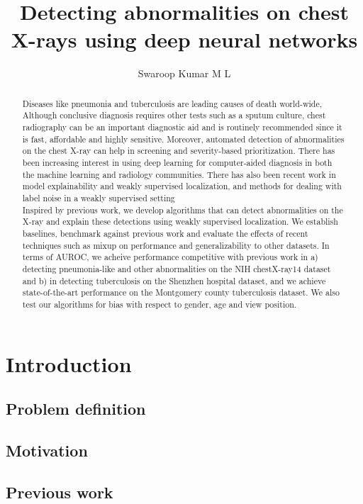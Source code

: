 \documentclass[11pt,twoside,a4paper]{report}
\title{Detecting abnormalities on chest X-rays using deep neural networks}
\author{Swaroop Kumar M L}
\begin{document}
\maketitle
\begin{abstract}
    Diseases like pneumonia and tuberculosis are leading causes of death world-wide,
    Although conclusive diagnosis requires other tests such as a sputum culture,
    chest radiography can be an important diagnostic aid and is routinely recommended
    since it is fast, affordable and highly sensitive. Moreover, automated detection of
    abnormalities on the chest X-ray can help in screening and severity-based prioritization.
    There has been increasing interest in using deep learning for computer-aided diagnosis in both the
    machine learning and radiology communities. There has also been recent work in model explainability and
    weakly supervised localization, and methods for dealing with label noise in a weakly supervised setting\\

    Inspired by previous work, we develop algorithms that
    can detect abnormalities on the X-ray and explain these detections using weakly supervised localization.
    We establish baselines, benchmark against previous work and evaluate the effects of recent techniques
    such as mixup on performance and generalizability to other datasets.
    In terms of AUROC, we acheive performance competitive with previous work in a) detecting pneumonia-like
    and other abnormalities on the NIH chestX-ray14 dataset and b) in detecting tuberculosis on the Shenzhen
    hospital dataset, and we achieve state-of-the-art performance on the Montgomery county tuberculosis dataset.
    We also test our algorithms for bias with respect to gender, age and view position. 
\end{abstract}
\tableofcontents
\chapter{Introduction}
    \section{Problem definition}
    \section{Motivation}
    \section{Previous work}
\end{document}
